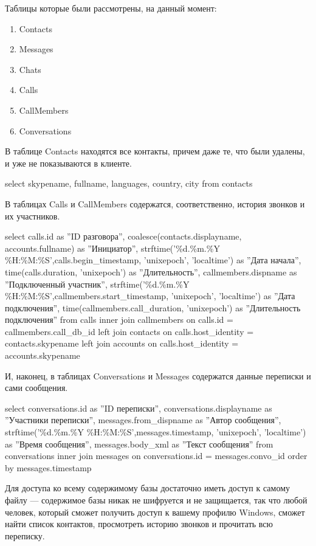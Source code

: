 Таблицы которые были рассмотрены, на данный момент:    
\begin{enumerate}
\item Contacts
\item Messages
\item Chats
\item Calls
\item CallMembers
\item Conversations
\end{enumerate}

В таблице Contacts находятся все контакты, причем даже те, что были удалены, и уже не показываются в клиенте.

\noindent select skypename, fullname, languages, country, city from contacts

В таблицах Calls и CallMembers содержатся, соответственно, история звонков и их участников.

\noindent select calls.id as ''ID разговора'', coalesce(contacts.displayname, accounts.fullname) as ''Инициатор'', strftime('\%d.\%m.\%Y \%H:\%M:\%S',calls.begin\_timestamp, 'unixepoch', 'localtime') as ''Дата начала'', time(calls.duration, 'unixepoch') as ''Длительность'', callmembers.dispname as ''Подключенный участник'', strftime('\%d.\%m.\%Y \%H:\%M:\%S',callmembers.start\_timestamp, 'unixepoch', 'localtime') as ''Дата подключения'', time(callmembers.call\_duration, 'unixepoch') as ''Длительность подключения'' from calls inner join callmembers on calls.id = callmembers.call\_db\_id left  join contacts on calls.host\_identity = contacts.skypename left  join accounts on calls.host\_identity = accounts.skypename

И, наконец, в таблицах Conversations и Messages содержатся данные переписки и сами сообщения.

\noindent select conversations.id as ''ID переписки'', conversations.displayname as ''Участники переписки'', 
       messages.from\_dispname as ''Автор сообщения'',
       strftime('\%d.\%m.\%Y \%H:\%M:\%S',messages.timestamp, 'unixepoch', 'localtime') as ''Время сообщения'', 
       messages.body\_xml as ''Текст сообщения''
  from conversations
       inner join messages on conversations.id = messages.convo\_id
order by messages.timestamp

Для доступа ко всему содержимому базы достаточно иметь доступ к самому файлу — содержимое базы никак не шифруется и не защищается, так что любой человек, который сможет получить доступ к вашему профилю Windows, сможет найти список контактов, просмотреть историю звонков и прочитать всю переписку. 

